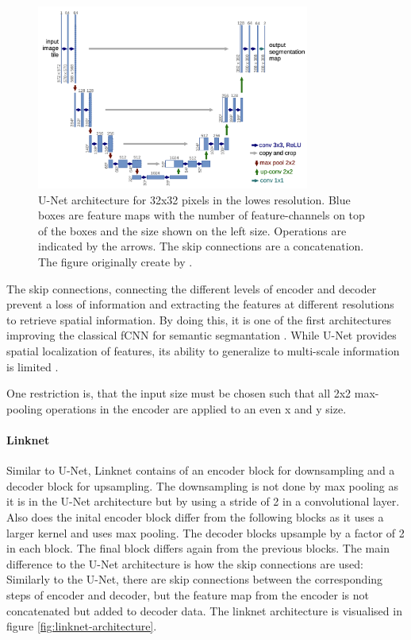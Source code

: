 \begin{figure}[htb!]
	\centering
	\includegraphics[width=0.8\textwidth]{fig/unet-architecture.png}
	\caption{U-Net architecture for 32x32 pixels in the lowes resolution. Blue boxes are feature maps with the number of feature-channels on top of the boxes and the size shown on the left size. Operations are indicated by the arrows. The skip connections are a concatenation. The figure originally create by \citeauthor{unet} \cite{unet}.}
	\label{fig:unet-architecture}
\end{figure}

The skip connections, connecting the different levels of encoder and decoder prevent a loss of information and extracting the features at different resolutions to retrieve spatial information. By doing this, it is one of the first architectures improving the classical fCNN for semantic segmantation \cite{Litjens2017}. While U-Net provides spatial localization of features, its ability to generalize to multi-scale information is limited \cite{Norelyaqine2023}.

One restriction is, that the input size must be chosen such that all 2x2 max-pooling operations in the encoder are applied to an even x and y size.


\paragraph{Linknet}

Similar to U-Net, Linknet contains of an encoder block for downsampling and a decoder block for upsampling. The downsampling is not done by max pooling as it is in the U-Net architecture but by using a stride of 2 in a convolutional layer. Also does the inital encoder block differ from the following blocks as it uses a larger kernel and uses max pooling. The decoder blocks upsample by a factor of 2 in each block. The final block differs again from the previous blocks. The main difference to the U-Net architecture is how the skip connections are used: Similarly to the U-Net, there are skip connections between the corresponding steps of encoder and decoder, but the feature map from the encoder is not concatenated but added to decoder data. The linknet architecture is visualised in figure \ref{fig:linknet-architecture}. \cite{linknet}

